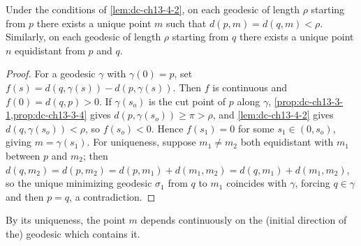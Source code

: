 \begin{lemma}
  \label{lem:dc-ch13-4-3}
  Under the conditions of \cref{lem:dc-ch13-4-2}, on each geodesic of length $\rho$ starting from
  $p$ there exists a unique point $m$ such that $d(p,m)=d(q,m)<\rho$. Similarly, on
  each geodesic of length $\rho$ starting from $q$ there exists a unique point $n$
  equidistant from $p$ and $q$.
\end{lemma}
\begin{proof}
\sketch
  For a geodesic $\gamma$ with $\gamma(0)=p$, set
  $f(s)=d(q,\gamma(s))-d(p,\gamma(s))$. Then $f$ is continuous and $f(0)=d(q,p)>0$. If
  $\gamma(s_o)$ is the cut point of $p$ along $\gamma$,
  \cref{prop:dc-ch13-3-1,prop:dc-ch13-3-4} gives
  $d(p,\gamma(s_o))\geq\pi>\rho$, and
  \cref{lem:dc-ch13-4-2} gives $d(q,\gamma(s_o))<\rho$, so $f(s_o)<0$. Hence $f(s_1)=0$ for some
  $s_1\in(0,s_o)$, giving $m=\gamma(s_1)$. For uniqueness, suppose $m_1\neq m_2$ both
  equidistant with $m_1$ between $p$ and $m_2$; then
  $d(q,m_2)=d(p,m_2)=d(p,m_1)+d(m_1,m_2)=d(q,m_1)+d(m_1,m_2)$, so the unique minimizing
  geodesic $\sigma_1$ from $q$ to $m_1$ coincides with $\gamma$, forcing $q\in\gamma$
  and then $p=q$, a contradiction.
\end{proof}

\begin{remark}
  \label{rem:dc-ch13-4-4}
  By its uniqueness, the point $m$ depends continuously on the (initial direction of
  the) geodesic which contains it.
\end{remark}
